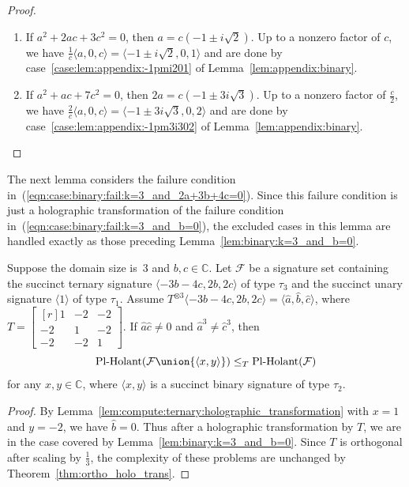\documentclass[11pt]{article}
\newcommand{\PlHolant}{\operatorname{Pl-Holant}}
\begin{document}
\begin{proof}
\begin{enumerate}
  \item If $a^2 + 2 a c + 3 c^2 = 0$,
  then $a = c (-1 \pm i \sqrt{2})$.
  Up to a nonzero factor of $c$,
  we have $\frac{1}{c} \langle a,0,c \rangle = \langle -1 \pm i \sqrt{2}, 0, 1 \rangle$
  and are done by case~\ref{case:lem:appendix:-1pmi201} of Lemma~\ref{lem:appendix:binary}.
  
  \item If $a^2 + a c + 7 c^2 = 0$,
  then $2 a = c (-1 \pm 3 i \sqrt{3})$.
  Up to a nonzero factor of $\frac{c}{2}$,
  we have $\frac{2}{c} \langle a,0,c \rangle = \langle -1 \pm 3 i \sqrt{3}, 0, 2 \rangle$
  and are done by case~\ref{case:lem:appendix:-1pm3i302} of Lemma~\ref{lem:appendix:binary}.
  \qedhere
 \end{enumerate}
\end{proof}

The next lemma considers the failure condition in~(\ref{eqn:case:binary:fail:k=3_and_2a+3b+4c=0}).
Since this failure condition is just a holographic transformation of the failure condition in~(\ref{eqn:case:binary:fail:k=3_and_b=0}),
the excluded cases in this lemma are handled exactly as those preceding Lemma~\ref{lem:binary:k=3_and_b=0}.

\begin{lemma} \label{lem:binary:k=3_and_2a+3b+4c=0}
 Suppose the domain size is~$3$ and $b, c \in \mathbb{C}$.
 Let $\mathcal{F}$ be a signature set containing the succinct ternary signature $\langle -3 b -4 c, 2 b, 2 c \rangle$ of type $\tau_3$
 and the succinct unary signature $\langle 1 \rangle$ of type $\tau_1$.
 Assume $T^{\otimes 3} \langle -3 b -4 c, 2 b, 2 c \rangle = \langle \hat{a}, \hat{b}, \hat{c} \rangle$,
 where $T = \left[\begin{smallmatrix*}[r] 1 & -2 & -2 \\ -2 & 1 & -2 \\ -2 & -2 & 1 \end{smallmatrix*}\right]$.
 If $\hat{a} \hat{c} \ne 0$ and $\hat{a}^3 \ne \hat{c}^3$,
 then
 \[
  \PlHolant(\mathcal{F} \union \{\langle x,y \rangle\}) \le_T \PlHolant(\mathcal{F})
 \]
 for any $x,y \in \mathbb{C}$,
 where $\langle x,y \rangle$ is a succinct binary signature of type $\tau_2$.
\end{lemma}

\begin{proof}
 By Lemma~\ref{lem:compute:ternary:holographic_transformation} with $x = 1$ and $y = -2$,
 we have $\hat{b} = 0$.
 Thus after a holographic transformation by $T$,
 we are in the case covered by Lemma~\ref{lem:binary:k=3_and_b=0}.
 Since $T$ is orthogonal after scaling by $\frac{1}{3}$,
 the complexity of these problems are unchanged by Theorem~\ref{thm:ortho_holo_trans}.
\end{proof}
\end{document}
